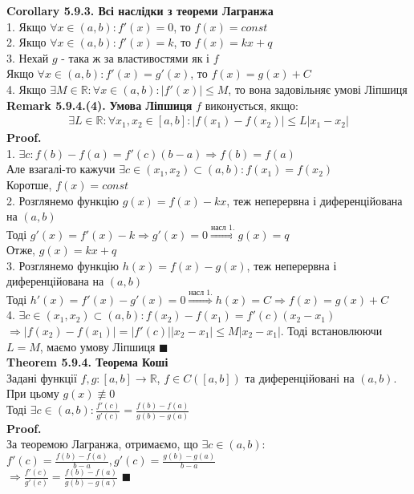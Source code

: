\documentclass[a4paper, 14pt]{extarticle}
\def\huge{\displaystyle}
\def\bigline{\vspace{5mm}\\}
\def\rm#1{\textbf{Remark {#1}}}
\def\th#1{\textbf{Theorem {#1}}}
\def\crl#1{\textbf{Corollary {#1}}}
\def\proof{\textbf{Proof.}\\}
\def\bigline{\vspace{5mm}\\}
\def\qed{$\blacksquare$}
\begin{document}
\crl{5.9.3. Всі наслідки з теореми Лагранжа}\\
1. Якщо $\forall x \in (a,b): f'(x) = 0$, то $f(x) = const$\\
2. Якщо $\forall x \in (a,b): f'(x) = k$, то $f(x) = kx + q$\\
3. Нехай $g$ - така ж за властивостями як і $f$ \\ Якщо $\forall x \in (a,b): f'(x) = g'(x)$, то $f(x) = g(x) + C$\\
4. Якщо $\exists M \in \mathbb{R}: \forall x \in (a,b): |f'(x)| \leq M$, то вона задовільняє умові Ліпшиця
\bigline
\rm{5.9.4.(4).} \textbf{Умова Ліпшиця} $f$ виконується, якщо:
\begin{align*}
\exists L \in \mathbb{R}: \forall x_1,x_2 \in [a,b]: |f(x_1)-f(x_2)| \leq L|x_1-x_2|
\end{align*}
\proof
1. $\exists c: f(b)-f(a) = f'(c)(b-a) \Rightarrow f(b) = f(a)$\\
Але взагалі-то кажучи $\exists c \in (x_1,x_2) \subset (a,b): f(x_1) = f(x_2)$\\
Коротше, $f(x) = const$\bigline
2. Розглянемо функцію $g(x) = f(x) - kx$, теж неперервна і диференційована на $(a,b)$\\
Тоді $g'(x) = f'(x) - k \Rightarrow g'(x) = 0 \overset{\textrm{насл 1.}}{\Rightarrow} g(x) = q$\\
Отже, $g(x) = kx + q$\bigline
3. Розглянемо функцію $h(x) = f(x) - g(x)$, теж неперервна і диференційована на $(a,b)$\\
Тоді $h'(x) = f'(x) - g'(x) = 0 \overset{\textrm{насл 1.}}{\Rightarrow} h(x) = C \Rightarrow f(x) = g(x) + C$\bigline
4. $\exists c \in (x_1,x_2) \subset (a,b): f(x_2)-f(x_1)=f'(c)(x_2-x_1)$\\
$\Rightarrow |f(x_2)-f(x_1)|=|f'(c)||x_2-x_1| \leq M|x_2-x_1|$. Тоді встановлюючи $L=M$, маємо умову Ліпшиця \qed
\bigline
\th{5.9.4. Теорема Коші}\\
Задані функції $f,g: [a,b] \to \mathbb{R}$, $f \in C([a,b])$ та диференційовані на $(a,b)$. При цьому $g(x) \not\equiv 0$\\
Тоді $\exists c \in (a,b): \huge \frac{f'(c)}{g'(c)}  =  \frac{f(b)-f(a)}{g(b)-g(a)}$\\
\proof
За теоремою Лагранжа, отримаємо, що $\exists c \in (a,b):$\\
$f'(c) = \huge \frac{f(b)-f(a)}{b-a}, g'(c) = \huge \frac{g(b)-g(a)}{b-a}$\\
$\Rightarrow \huge \frac{f'(c)}{g'(c)} = \frac{f(b)-f(a)}{g(b)-g(a)}$ \qed
\bigline
\end{document}
